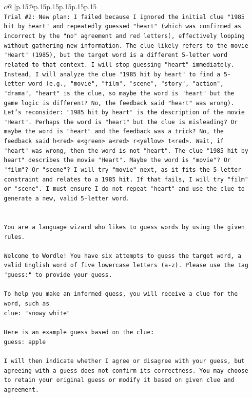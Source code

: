 \documentclass{article}
\begin{document}
{\begin{supertabular}{c@{$\;$}|p{.15\linewidth}@{}p{.15\linewidth}p{.15\linewidth}p{.15\linewidth}p{.15\linewidth}p{.15\linewidth}}
{{{\\ 
\texttt{Trial \#2: New plan: I failed because I ignored the initial clue "1985 hit by heart" and repeatedly guessed "heart" (which was confirmed as incorrect by the "no" agreement and red letters), effectively looping without gathering new information. The clue likely refers to the movie "Heart" (1985), but the target word is a different 5{-}letter word related to that context. I will stop guessing "heart" immediately. Instead, I will analyze the clue "1985 hit by heart" to find a 5{-}letter word (e.g., "movie", "film", "scene", "story", "action", "drama", "heart" is the clue, so maybe the word is "heart" but the game logic is different? No, the feedback said "heart" was wrong). Let's reconsider: "1985 hit by heart" is the description of the movie "Heart". Perhaps the word is "heart" but the clue is misleading? Or maybe the word is "heart" and the feedback was a trick? No, the feedback said h<red> e<green> a<red> r<yellow> t<red>. Wait, if "heart" was wrong, then the word is not "heart". The clue "1985 hit by heart" describes the movie "Heart". Maybe the word is "movie"? Or "film"? Or "scene"? I will try "movie" next, as it fits the 5{-}letter constraint and relates to a 1985 hit. If that fails, I will try "film" or "scene". I must ensure I do not repeat "heart" and use the clue to generate a new, valid 5{-}letter word.} \\
\\ 
\\ 
\texttt{You are a language wizard who likes to guess words by using the given rules.} \\
\\ 
\texttt{Welcome to Wordle! You have six attempts to guess the target word, a valid English word of five lowercase letters (a{-}z). Please use the tag "guess:" to provide your guess.} \\
\\ 
\texttt{To help you make an informed guess, you will receive a clue for the word, such as} \\
\texttt{clue: "snowy white"} \\
\\ 
\texttt{Here is an example guess based on the clue: } \\
\texttt{guess: apple} \\
\\ 
\texttt{I will then indicate whether I agree or disagree with your guess, but agreeing with a guess does not confirm its correctness. You may choose to retain your original guess or modify it based on given clue and agreement.} \\
}}}
\end{supertabular}}
\end{document}
